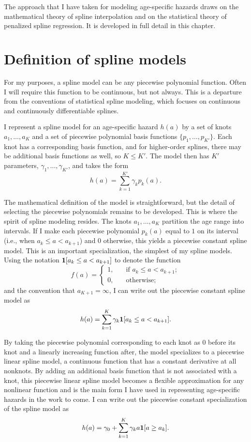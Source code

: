 The approach that I have taken for modeling age-specific hazards draws
on the mathematical theory of spline interpolation and on the
statistical theory of penalized spline regression.  It is developed in
full detail in this chapter.


\section{Definition of spline models}
\label{spline_models}
For my purposes, a spline model can be any piecewise polynomial
function.  Often I will require this function to be continuous, but
not always.  This is a departure from the conventions of statistical
spline modeling, which focuses on continuous and continuously
differentiable splines.\cite{hastie_elements_2009,wahba_spline_1990}

I represent a spline model for an age-specific hazard $h(a)$ by a set
of knots $a_1,\dots,a_{K}$ and a set of piecewise polynomial basis
functions $\{p_1,\ldots,p_{K'}\}$.  Each knot has a corresponding
basis function, and for higher-order splines, there may be additional
basis functions as well, so $K \leq K'$.  The model then has $K'$
parameters, $\gamma_1,\ldots,\gamma_{K'}$, and takes the form
\[
h(a) = \sum_{k=1}^{K'} \gamma_k p_k(a).
\]

The mathematical definition of the model is straightforward, but the
detail of selecting the piecewise polynomials remains to be developed.
This is where the spirit of spline modeling resides. The knots $a_1,
\dots, a_{K}$ partition the age range into intervals. If I make each
piecewise polynomial $p_k(a)$ equal to $1$ on its interval (i.e., when
$a_k \leq a < a_{k+1}$) and $0$ otherwise, this yields a piecewise
constant spline model.  This is an important specialization, the
simplest of my spline models.  Using the notation $\mathbf{1}[a_k \leq a <
  a_{k+1}]$ to denote the function
\[f(a)
= \begin{cases}1,&\quad\text{if }a_k \leq a <
  a_{k+1};\\0,&\quad\text{otherwise;}\end{cases}
\]
 and the convention
that $a_{K+1} = \infty$, I can write out the piecewise constant spline
model as
\[
h(a) = \sum_{k=1}^K \gamma_k \mathbf{1}[a_k \leq a < a_{k+1}].
\]

By taking the piecewise polynomial corresponding to each knot as $0$
before its knot and a linearly increasing function after, the model
specializes to a piecewise linear spline model, a continuous
function that has a constant derivative at all nonknots.  By adding
an additional basis function that is not associated with a knot, this
piecewise linear spline model becomes a flexible approximation for any
nonlinear function and is the main form I have used in representing
age-specific hazards in the work to come.  I can write out the
piecewise constant specialization of the spline model as
\[
h(a) = \gamma_0 + \sum_{k=1}^K \gamma_k a \mathbf{1}[a \geq a_k].
\]

